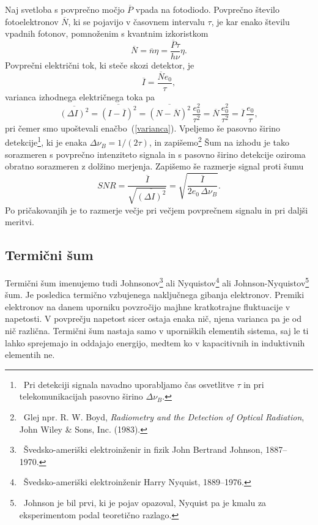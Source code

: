 Naj svetloba s povprečno močjo $\overline{P}$ vpada na fotodiodo.
Povprečno število fotoelektronov $\overline{N}$, ki se pojavijo v časovnem intervalu 
$\tau$, je kar enako številu vpadnih fotonov, pomnoženim 
s kvantnim izkoristkom
\begin{equation}
\overline{N} = \overline{n}\eta = \frac{\overline{P}\tau}{h \nu}\eta.
\end{equation}
Povprečni električni tok, ki steče skozi detektor, je  
\begin{equation}
\overline{I} = \frac{\overline{N} e_0}{\tau},
\end{equation}
varianca izhodnega električnega toka pa
\begin{equation}
\overline{(\Delta I)^2}=\overline{(I-\overline{I})^2} = \overline{(N-\overline{N})^2}\,
\frac{e_0^2}{\tau^2} = \overline{N}\,\frac{e_0^2}{\tau^2}= \overline{I}\,\frac{e_0}{\tau},
\end{equation}
pri čemer smo upoštevali enačbo~(\ref{varianca}). Vpeljemo še pasovno širino 
detekcije\footnote{~Pri detekciji signala navadno uporabljamo
čas osvetlitve $\tau$ in pri telekomunikacijah pasovno širino $\Delta\nu_B$.}, ki je 
enaka $\Delta\nu_B = 1/(2\tau)$,
in zapišemo\footnote{~Glej npr. R. W. Boyd, 
{\it Radiometry and the Detection of Optical Radiation}, John Wiley \& Sons, 
Inc. (1983).}
Šum na izhodu je tako sorazmeren s povprečno intenziteto signala in 
s pasovno širino detekcije oziroma obratno sorazmeren z dolžino 
merjenja. Zapišemo še razmerje signal proti šumu 
\begin{equation}
SNR = \frac{\overline{I}}{\sqrt{\overline{(\Delta I)^2}}}= \sqrt{\frac{\overline{I}}
{2 e_0\, \Delta\nu_B}}.
\label{SNRs}
\end{equation}
Po pričakovanjih je to razmerje večje pri večjem povprečnem signalu in pri daljši meritvi.

\subsection*{Termični šum} 
Termični šum 
imenujemo tudi Johnsonov\footnote{~Švedsko-ameriški elektroinženir in fizik 
John Bertrand Johnson, 1887--1970.} ali Nyquistov\footnote{~Švedsko-ameriški elektroinženir
Harry Nyquist, 1889--1976.} ali Johnson-Nyquistov\footnote{~Johnson je bil prvi, 
ki je pojav opazoval, 
Nyquist pa je kmalu za eksperimentom podal teoretično razlago.} šum. 
Je posledica termično vzbujenega naključnega gibanja elektronov. Premiki elektronov
na danem uporniku povzročijo majhne kratkotrajne 
fluktuacije v napetosti. V povprečju napetost sicer ostaja enaka nič, njena varianca pa je od 
nič različna. 
Termični šum nastaja samo v uporniških elementih sistema, saj le ti lahko
sprejemajo in oddajajo energijo, medtem ko v kapacitivnih in induktivnih elementih ne.

